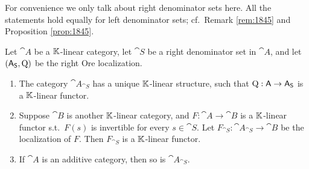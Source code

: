 For convenience we only talk about right denominator sets here. 
All the statements hold equally for left denominator sets; cf.\ Remark 
\ref{rem:1845} and Proposition \ref{prop:1845}.

\begin{thm} \label{thm:104}
Let $\cat{A}$ be a $\mathbb{K}$-linear category, let $\cat{S}$ be a right
denominator set in $\cat{A}$, and let $(\operatorname{\mathsf{A}}_{\operatorname{\mathsf{S}}}, \operatorname{Q})$ be the 
right Ore
localization.

\begin{enumerate}
\item  The category $\cat{A}_{\cat{S}}$ has a unique $\mathbb{K}$-linear structure,
such that $\operatorname{Q} : \operatorname{\mathsf{A}} \to \operatorname{\mathsf{A}}_{\operatorname{\mathsf{S}}}$ is a $\mathbb{K}$-linear 
functor. 

\item Suppose $\cat{B}$ is another $\mathbb{K}$-linear category, and 
$F : \cat{A} \to \cat{B}$ is a $\mathbb{K}$-linear functor s.t.\
$F(s)$ is invertible for every $s \in \cat{S}$. Let 
$F_{\cat{S}} : \cat{A}_{\cat{S}} \to \cat{B}$ be the localization of $F$. Then 
$F_{\cat{S}}$ is a $\mathbb{K}$-linear functor. 

\item If $\cat{A}$ is an additive category, then so is $\cat{A}_{\cat{S}}$.
\end{enumerate}
\end{thm}

